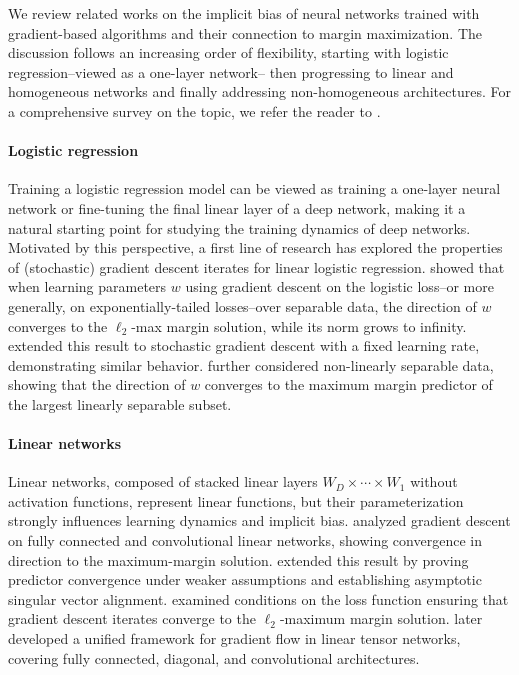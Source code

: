 We review related works  on the implicit bias of neural networks trained with gradient-based algorithms and their connection to margin maximization. The discussion follows an increasing order of flexibility, starting with logistic regression--viewed as a one-layer network-- then progressing to linear and homogeneous networks and finally addressing non-homogeneous architectures. For a comprehensive survey on the topic, we refer the reader to \cite{vardi2023implicit}.


\paragraph{Logistic regression} Training a logistic regression model can be viewed as training a one-layer neural network or fine-tuning the final linear layer of a deep network, making it a natural starting point for studying the training dynamics of deep networks. Motivated by this perspective, a first line of research has explored the properties of (stochastic) gradient descent iterates for linear logistic regression.
\cite{soudry2018implicit} showed that when learning parameters  $w$  using gradient descent on the logistic loss--or more generally, on exponentially-tailed losses--over separable data, the direction of $w$  converges to the $\ell_2$-max margin solution, while its norm grows to infinity. \cite{nacson2019stochastic} extended this result to stochastic gradient descent with a fixed learning rate, demonstrating similar behavior. \cite{ji2018risk} further considered non-linearly separable data, showing that the direction of $w$ converges to the maximum margin predictor of the largest linearly separable subset.

\paragraph{Linear networks} Linear networks, composed of stacked linear layers $W_D \times \cdots \times W_1$ without activation functions, represent linear functions, but their parameterization strongly influences learning dynamics and implicit bias.  
\cite{gunasekar2018implicit} analyzed gradient descent on fully connected and convolutional linear networks, showing convergence in direction to the maximum-margin solution. \cite{ji2018gradient} extended this result by proving predictor convergence under weaker assumptions and establishing asymptotic singular vector alignment. \cite{nacson2019convergence} examined conditions on the loss function ensuring that gradient descent iterates converge to the $\ell_2$-maximum margin solution. \cite{yun2020unifying} later developed a unified framework for gradient flow in linear tensor networks, covering fully connected, diagonal, and convolutional architectures. 

